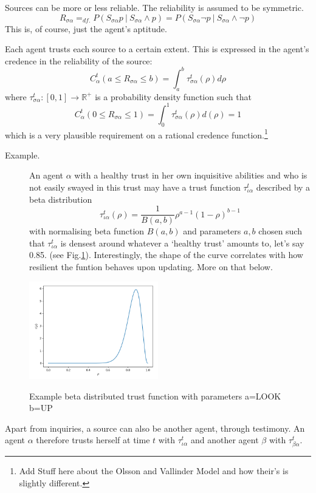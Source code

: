 \documentclass[11pt, a4paper]{article}
\newcommand{\Ssa}{S_{\sigma\alpha}}
\newcommand{\sa}{{\sigma\alpha}}
\newcommand{\given}[1][]{\:#1\vert\:}
\begin{document}
Sources can be more or less reliable. The reliability is assumed to be symmetric.
\[ 
R_{\sigma \alpha} =_{df.} P(\Ssa p \given \Ssa \land p) = P(\Ssa \neg p \given \Ssa \land \neg p)
\]
This is, of course, just the agent's aptitude. 

Each agent trusts each source to a certain extent. This is expressed in the agent's credence in the reliability of the source:
\[ 
    C^t_{\alpha}(a \leqslant R_{\sa} \leqslant b) = \int_a^b \tau^t_{\sa}(\rho) d\rho
\]
where $\tau^t_{\sa}: [0,1] \rightarrow \mathbb{R}^+$ is a probability density function such that 
\[
    C^t_{\alpha}(0 \leqslant R_{\sa} \leqslant 1) =  \int_0^1 \tau^t_{\sa} (\rho) d(\rho) = 1
\]which is a very plausible requirement on a rational credence function.\footnote{Add Stuff here about the Olsson and Vallinder Model and how their's is slightly different.}

\begin{description}
    \item[Example.] An agent $\alpha$ with a healthy trust in her own inquisitive abilities and who is not easily swayed in this trust may have a trust function $\tau^t_{\iota\alpha}$ described by a beta distribution
\[
    \tau^t_{\iota\alpha} (\rho) = \frac{1}{B(a,b)} \rho^{a - 1} {(1 - \rho)}^{b-1}
\]
with normalising beta function $B(a,b)$ and parameters $a, b$ chosen such that $\tau^t_{\iota\alpha}$ is densest around whatever a `healthy trust' amounts to, let's say 0.85. (see Fig.\ref{fig1}). Interestingly, the shape of the curve correlates with how resilient the funtion behaves upon updating. More on that below.
\end{description}

\begin{figure}[ht]
	\centering\label{fig1}
    \includegraphics[width=0.5\textwidth]{Figure_1.png}
	\caption{Example beta distributed trust function with parameters a=LOOK b=UP }
\end{figure}

Apart from inquiries, a source can also be another agent, through testimony. An agent $\alpha$ therefore trusts herself at time $t$ with $\tau^t_{\iota\alpha}$ and another agent $\beta$ with $\tau^t_{\beta\alpha}$.
\end{document}

